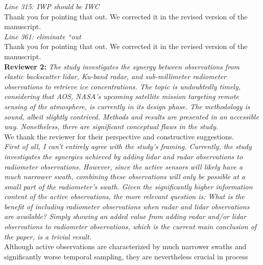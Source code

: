 \documentclass[12pt]{article}
\begin{document}
\newline
\textit{Line 315: IWP should be IWC}\\
\newline
Thank you for pointing that out. We corrected it in the revised version of the manuscript.\\
\newline
\textit{Line 361: eliminate “out}\\
\newline
Thank you for pointing that out. We corrected it in the revised version of the manuscript.\\
\newline
\newline
\clearpage
\noindent \textbf{Reviewer 2:}
\newline \textit{The study investigates the synergy between observations from elastic backscatter lidar, Ku-band radar,
and sub-millimeter radiometer observations to retrieve ice concentrations. The topic is undoubtedly timely,
considering that AOS, NASA's upcoming satellite mission targeting remote sensing of the atmosphere,
is currently in its design phase. The methodology is sound, albeit slightly contrived. Methods and
results are presented in an accessible way.
Nonetheless, there are significant conceptual flaws in the study.}\\
\newline
We thank the reviewer for their perspective and constructive suggestions.\\
\newline
\noindent \textit{First of all, I can't entirely agree with the study's framing. Currently, 
the study investigates the synergies
achieved by adding lidar and radar observations to radiometer observations. 
However, since the active sensors will likely have a much narrower swath, 
combining these observations will only be possible at
a small part of the radiometer's swath. Given the significantly higher information 
content of the active observations, the more relevant question is: What is the 
benefit of including radiometer observations
when radar and lidar observations are available? Simply showing an added value 
from adding radar
and/or lidar observations to radiometer observations, which is the current main 
conclusion of the paper, is a trivial result.}\\
\newline
Although active observations are characterized by much narrower swaths and 
significantly worse temporal sampling, they are nevertheless crucial in process 
\end{document}
